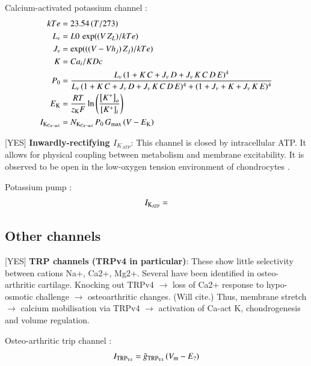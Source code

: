 Calcium-activated potassium channel \citep{HorriganAldrich2002}:
\begin{equation}
  \begin{split}
    kTe & = 23.54\, (T/273)\\
    L_v & = L0\, \exp((V\, Z_L)/kTe)\\
    J_v & = \exp(((V - Vh_j)\, Z_j)/kTe)\\
    K & = Ca_i/KDc\\
    P_0 & = \frac{L_v\, (1+K\, C+J_v\, D+J_v\, K\, C\, D\, E)^4}
    {L_v\, (1+K\, C+J_v\, D+J_v\, K\, C\, D\, E)^4 +
      (1+J_v+K+J_v\, K\, E)^4}\\
    E_{\rm K} & =  \frac{R T}{z_{\rm K} F}
    \ln\left(\frac{\left[K^{+}\right]_{o}}
      {\left[K^{+}\right]_{i}}\right)\\
    I_{\rm K_{Ca-act}} & = N_{\rm K_{Ca-act}}\, P_0\, G_{\rm max}\, (V -
    E_{\rm K})
  \end{split}
\end{equation}

[YES] {\bf Inwardly-rectifying $I_{K_{ATP}}$}: This channel is closed by
intracellular ATP. It allows for physical coupling between metabolism
and membrane excitability. It is observed to be open in the low-oxygen
tension environment of chondrocytes \citep{DartStanden1994,
  Mobasherietal2007}.

Potassium pump \citep{UNKNOWN}:
\begin{equation}
  I_{\rm K_{ATP}} =
\end{equation}

\subsection{Other channels}
\label{sec:other-channels}

[YES] {\bf TRP channels (TRPv4 in particular)}: These show little
selectivity between cations Na+, Ca2+, Mg2+. Several have been
identified in osteo-arthritic cartilage. Knocking out TRPv4
$\rightarrow$ loss of Ca2+ response to hypo-osmotic challenge
$\rightarrow$ osteoarthritic changes. (Will cite.) Thus, membrane
stretch $\rightarrow$ calcium mobilisation via TRPv4 $\rightarrow$
activation of Ca-act K, chondrogenesis and volume regulation.

Osteo-arthritic trip channel \citep{UNKNOWN}:
\begin{equation}
  I_{\rm TRP_{V4}} = \bar{g}_{\rm TRP_{V4}}\, (V_{\rm m} - E_{\rm ?})
\end{equation}

